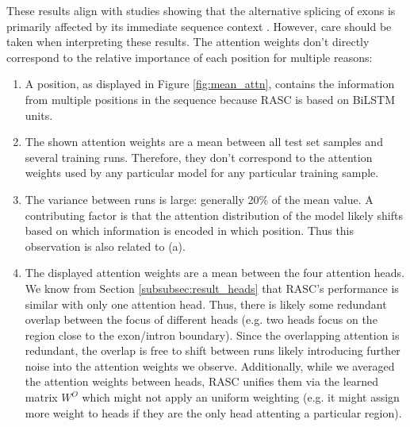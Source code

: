 These results align with studies showing that the alternative splicing of exons is primarily affected by its immediate sequence context \cite{dsc} \cite{immediatesequencemostimportant} \cite{immediatesequencemostimportant2}. 
However, care should be taken when interpreting these results. The attention weights don't directly correspond to the relative importance of each position for multiple reasons: 
\begin{enumerate}[label=(\alph*)]
	\item A position, as displayed in Figure \ref{fig:mean_attn}, contains the information from multiple positions in the sequence because RASC is based on BiLSTM units.
	\item The shown attention weights are a mean between all test set samples and several training runs. Therefore, they don't correspond to the attention weights used by any particular model for any particular training sample. 
	\item The variance between runs is large: generally 20\% of the mean value. A contributing factor is that the attention distribution of the model likely shifts based on which information is encoded in which position. Thus this observation is also related to (a).
	\item The displayed attention weights are a mean between the four attention heads. We know from Section \ref{subsubsec:result_heads} that RASC's performance is similar with only one attention head. Thus, there is likely some redundant overlap between the focus of different heads (e.g. two heads focus on the region close to the exon/intron boundary). Since the overlapping attention is redundant, the overlap is free to shift between runs likely introducing further noise into the attention weights we observe. Additionally, while we averaged the attention weights between heads, RASC unifies them via the learned matrix $W^O$ which might not apply an uniform weighting (e.g. it might assign more weight to heads if they are the only head attenting a particular region). 
\end{enumerate}

